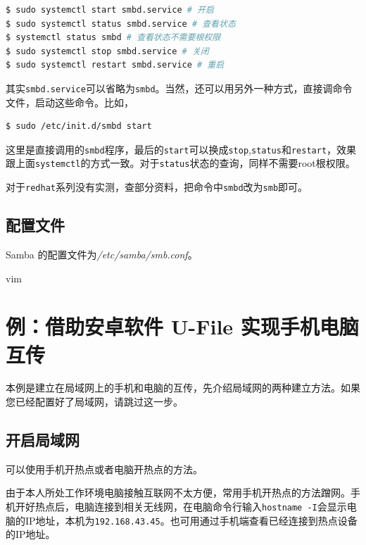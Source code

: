 \documentclass[doctor,openright,twoside]{sjtuthesis}
\newcommand{\passthrough}[1]{#1}
\theoremstyle{plain}
\theoremstyle{definition}
\theoremstyle{remark}
\theoremstyle{ocrenumbox}
\theoremstyle{plain}
\begin{document}
\begin{lstlisting}[language=bash]
$ sudo systemctl start smbd.service # 开启
$ sudo systemctl status smbd.service # 查看状态
$ systemctl status smbd # 查看状态不需要根权限
$ sudo systemctl stop smbd.service # 关闭
$ sudo systemctl restart smbd.service # 重启
\end{lstlisting}

其实\passthrough{\lstinline!smbd.service!}可以省略为\passthrough{\lstinline!smbd!}。当然，还可以用另外一种方式，直接调命令文件，启动这些命令。比如，

\begin{lstlisting}[language=bash]
$ sudo /etc/init.d/smbd start
\end{lstlisting}

这里是直接调用的\passthrough{\lstinline!smbd!}程序，最后的\passthrough{\lstinline!start!}可以换成\passthrough{\lstinline!stop!},\passthrough{\lstinline!status!}和\passthrough{\lstinline!restart!}，效果跟上面\passthrough{\lstinline!systemctl!}的方式一致。对于\passthrough{\lstinline!status!}状态的查询，同样不需要root根权限。

对于\passthrough{\lstinline!redhat!}系列没有实测，查部分资料，把命令中\passthrough{\lstinline!smbd!}改为\passthrough{\lstinline!smb!}即可。

\hypertarget{section-128}{%
\subsection{配置文件}\label{section-128}}

Samba 的配置文件为\emph{/etc/samba/smb.conf}。

vim

\hypertarget{u-file-}{%
\section{例：借助安卓软件 U-File 实现手机电脑互传}\label{u-file-}}

本例是建立在局域网上的手机和电脑的互传，先介绍局域网的两种建立方法。如果您已经配置好了局域网，请跳过这一步。

\hypertarget{section-129}{%
\subsection{开启局域网}\label{section-129}}

可以使用手机开热点或者电脑开热点的方法。

由于本人所处工作环境电脑接触互联网不太方便，常用手机开热点的方法蹭网。手机开好热点后，电脑连接到相关无线网，在电脑命令行输入\passthrough{\lstinline!hostname -I!}会显示电脑的IP地址，本机为\passthrough{\lstinline!192.168.43.45!}。也可用通过手机端查看已经连接到热点设备的IP地址。
\end{document}
